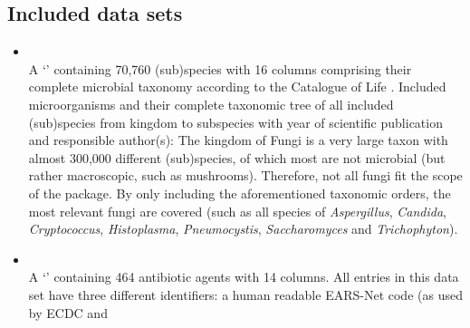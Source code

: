 \documentclass[article, shortnames]{jss}
\newcommand{\class}[1]{`\code{#1}'}
\begin{document}



\newpage

\begin{appendix}

\section{Included data sets} \label{app:datasets}

%
\begin{itemize}
  \item{\\
  A \class{data.frame} containing 70,760 (sub)species with 16 columns
comprising their complete microbial taxonomy according to the Catalogue of
Life \citep{CoL-zq}.  Included microorganisms and their complete taxonomic
tree of all included (sub)species from kingdom to subspecies with year of
scientific publication and responsible author(s):
%
  The kingdom of Fungi is a very large taxon with almost 300,000 different
(sub)species, of which most are not microbial (but rather macroscopic, such
as mushrooms).  Therefore, not all fungi fit the scope of the 
package.  By only including the aforementioned taxonomic orders, the most
relevant fungi are covered (such as all species of \emph{Aspergillus},
\emph{Candida}, \emph{Cryptococcus}, \emph{Histoplasma},
\emph{Pneumocystis}, \emph{Saccharomyces} and \emph{Trichophyton}).}
%
  \item{\\
  A \class{data.frame} containing 464 antibiotic agents with 14 columns. 
All entries in this data set have three different identifiers: a human
readable EARS-Net code (as used by ECDC \citep{EARS_Net} and 
}
\end{itemize}
\end{appendix}
\end{document}
